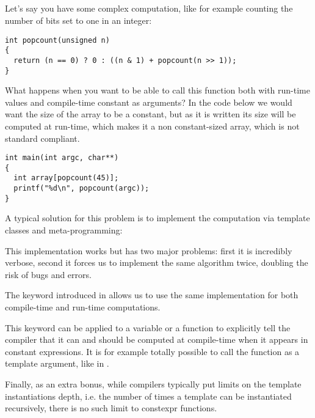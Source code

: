 \subsection{}

Let's say you have some complex computation, like for example counting
the number of bits set to one in an integer:

\begin{lstlisting}
int popcount(unsigned n)
{
  return (n == 0) ? 0 : ((n & 1) + popcount(n >> 1));
}
\end{lstlisting}

What happens when you want to be able to call this function both with
run-time values and compile-time constant as arguments? In the code
below we would want the size of the array to be a constant, but as it
is written its size will be computed at run-time, which makes it a non
constant-sized array, which is not standard compliant.

\begin{lstlisting}
int main(int argc, char**)
{
  int array[popcount(45)];
  printf("%d\n", popcount(argc));
}
\end{lstlisting}

A typical solution for this problem is to implement the computation
via template classes and meta-programming:


This implementation works but has two major problems: first it is
incredibly verbose, second it forces us to implement the same
algorithm twice, doubling the risk of bugs and errors.

\bigskip

The  keyword introduced in  allows us to use the
same implementation for both compile-time and run-time computations.


This keyword can be applied to a variable or a function to explicitly
tell the compiler that it can and should be computed at compile-time
when it appears in constant expressions. It is for example totally
possible to call the  function as a
template argument, like in .

Finally, as an extra bonus, while compilers typically put limits on
the template instantiations depth, i.e. the number of times a template
can be instantiated recursively, there is no such limit to
constexpr functions.

